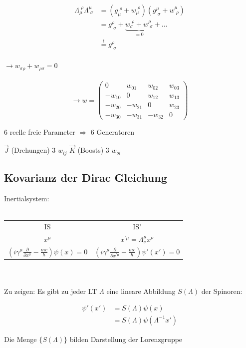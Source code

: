 \begin{align}
\Lambda^{\,\,\rho}_{\mu}\Lambda^\mu_{\,\,\sigma}  &= (g_\mu^{\,\,\rho}+w_\mu^{\,\,\rho})(g^\mu_{\,\,\sigma}+w^\mu_{\,\,\rho}) \\
&= g^\rho_{\,\,\sigma}+\underbrace{w_\sigma^{\,\,\rho}+w^\rho_{\,\,\sigma}}_{=0}+... \\
& \stackrel{\mathrm{!}}= g^\rho_{\,\,\sigma}
\end{align}
\\
\(\rightarrow w_{\sigma\rho}+w_{\rho\sigma}=0\)\\
\\
 \[ \rightarrow  w = \begin{pmatrix}0&w_{01}&w_{02}&w_{03}\\ -w_{10}&0&w_{12}&w_{13}\\-w_{20}&-w_{21}&0&w_{23}\\ -w_{30}&-w_{31}&-w_{32}&0\end{pmatrix} \]



6 reelle freie Parameter  \(\Rightarrow \) 6 Generatoren

\(\vec J\) (Drehungen) 3 \(w_{ij}\)
\(\vec K\) (Boosts) 3 \(w_{oi}\)


\subsection{Kovarianz der Dirac Gleichung}

Inertialsystem:\\
\\
\begin{tabular}{c|c}
  IS&IS'\\
\(x^\mu\)& \(x^{'\mu}=\Lambda^\mu_\nu x^\nu\)\\
\((i\gamma^\mu\frac{\partial}{\partial x^\mu}-\frac{mc}{\hbar})\psi(x) = 0\)&\((i\gamma^\mu\frac{\partial}{\partial x^{'\mu}}-\frac{mc}{\hbar})\psi'(x') = 0\)
\end{tabular}\\
\\

Zu zeigen: Es gibt zu jeder LT \(\Lambda\) eine lineare Abbildung \(S(\Lambda)\) der Spinoren:

 \begin{align}
\psi'(x')&=S(\Lambda)\psi(x)\\
&=S(\Lambda)\psi(\Lambda^{-1}x')
\end{align}

Die Menge \(\{S(\Lambda)\}\) bilden Darstellung der Lorenzgruppe

